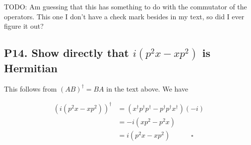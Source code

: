 TODO:
Am guessing that this has something to do with the commutator of the operators.  This one I don't have a check mark
besides in my text, so did I ever figure it out?

\subsection{P14. Show directly that $i(p^2 x - xp^2)$ is Hermitian }

This follows from $(AB)^\dagger = BA$ in the text above.  We have

\begin{align*}
(i (p^2 x - x p^2))^\dagger 
&=
(x^\dagger p^\dagger p^\dagger - p^\dagger p^\dagger x^\dagger)(-i) \\
&=
-i (x p^2 - p^2 x) \\
&=
i (p^2 x - x p^2 ) \quad\quad\quad \square
\end{align*}

%
%

%
